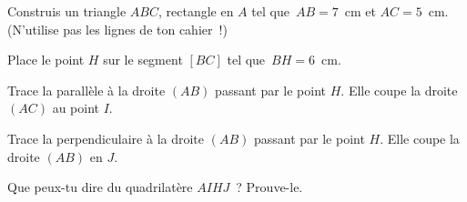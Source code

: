 \begin{myenumerate}
  \item Construis un triangle $ABC$, rectangle en $A$ tel que $AB=7$~cm et $AC=5$~cm. (N'utilise pas les lignes de ton cahier !)
  \item Place le point $H$ sur le segment $[BC]$ tel que $BH=6$~cm.
  \item Trace la parallèle à la droite $(AB)$ passant par le point $H$. Elle coupe la droite $(AC)$ au point $I$.
  \item Trace la perpendiculaire à la droite $(AB)$ passant par le point $H$. Elle coupe la droite $(AB)$ en $J$.
  \item Que peux-tu dire du quadrilatère $AIHJ$ ? Prouve-le.
\end{myenumerate}